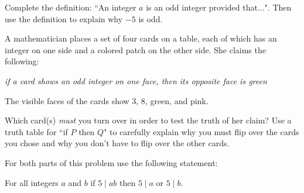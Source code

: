 \documentclass[11pt]{exam}
\begin{document}
\begin{questions}

\question[10] 
	Complete the definition: ``An integer $a$ is an odd integer provided that...". Then use the definition to explain why $-5$ is odd.

\vfill

\question[10]  A mathematician places a set of four cards on a table, each of which has an integer on one side and a colored patch on the other side. She claims the following: 
\begin{center}
\emph{ if a card shows an odd integer on one face, then its opposite face is green}
 \end{center}
 
  The visible faces of the cards show 3, 8, green, and pink. 

\begin{center}
\end{center}


Which card(s) \emph{must} you turn over in order to test the truth of her claim?  Use a truth table for ``if $P$ then $Q$" to carefully explain why you must flip over the cards you chose and why you don't have to flip over the other cards.
\vfill
\vfill
\vfill

\newpage


\question[10] For both parts of this problem use the following statement:
\begin{center}
For all integers $a$ and $b$ if $5\mid ab$ then $5\mid a$ or $5\mid b$.
\end{center}




\end{questions}
\end{document}
